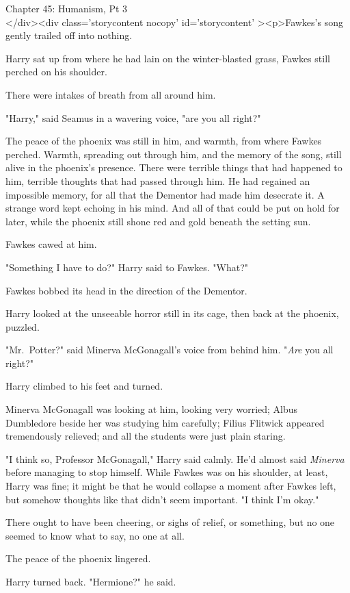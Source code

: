 
Chapter 45: Humanism, Pt 3\\
</div><div  class='storycontent nocopy' id='storycontent' ><p>Fawkes's song 
gently trailed off into nothing.

Harry sat up from where he had lain on the winter-blasted grass, Fawkes still 
perched on his shoulder.

There were intakes of breath from all around him.

"Harry," said Seamus in a wavering voice, "are you all right?"

The peace of the phoenix was still in him, and warmth, from where Fawkes 
perched. Warmth, spreading out through him, and the memory of the song, still 
alive in the phoenix's presence. There were terrible things that had happened 
to him, terrible thoughts that had passed through him. He had regained an 
impossible memory, for all that the Dementor had made him desecrate it. A 
strange word kept echoing in his mind. And all of that could be put on hold for 
later, while the phoenix still shone red and gold beneath the setting sun.

Fawkes cawed at him.

"Something I have to do?" Harry said to Fawkes. "What?"

Fawkes bobbed its head in the direction of the Dementor.

Harry looked at the unseeable horror still in its cage, then back at the 
phoenix, puzzled.

"Mr.~Potter?" said Minerva McGonagall's voice from behind him. "\emph{Are} you 
all right?"

Harry climbed to his feet and turned.

Minerva McGonagall was looking at him, looking very worried; Albus Dumbledore 
beside her was studying him carefully; Filius Flitwick appeared tremendously 
relieved; and all the students were just plain staring.

"I think so, Professor McGonagall," Harry said calmly. He'd almost said 
\emph{Minerva} before managing to stop himself. While Fawkes was on his 
shoulder, at least, Harry was fine; it might be that he would collapse a moment 
after Fawkes left, but somehow thoughts like that didn't seem important. "I 
think I'm okay."

There ought to have been cheering, or sighs of relief, or something, but no one 
seemed to know what to say, no one at all.

The peace of the phoenix lingered.

Harry turned back. "Hermione?" he said.

